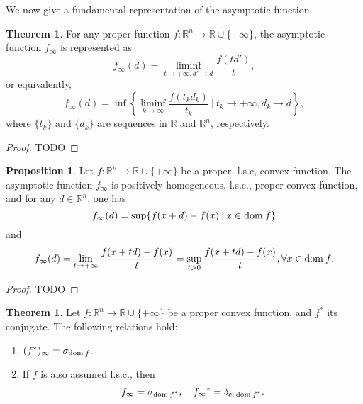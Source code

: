 \documentclass[a4paper,11pt, oneside]{book}
\theoremstyle{definition}
\newtheorem{prop}[dfn]{Proposition}
\newtheorem{thm}[dfn]{Theorem}
\newcommand{\RealNumberSet}{\mathbb{R}}
\newcommand{\NDemenstionalRealEuclideanSpace}{\mathbb{R}^n}
\newcommand{\Closure}[1]{\text{\rm cl\:${#1}$}} %
\newcommand{\Domain}[1]{\text{\rm dom\:${#1}$}} %
\newcommand{\ExtendedRealValuedFunction}[2]{{#1}: {#2} \to \RealNumberSet \cup \{+\infty\}}
\newcommand{\ConjugateFunction}[1]{{#1}^*}
\newcommand{\SupportFunction}[1]{\sigma_{#1}}
\newcommand{\IndicatorFunction}[1]{\delta_{#1}}
\begin{document}
We now give a fundamental representation of the asymptotic function.

\begin{thm}
  For any proper function $\ExtendedRealValuedFunction{f}{\NDemenstionalRealEuclideanSpace}$, the asymptotic function $f_{\infty}$ is represented as
  \begin{equation}
    f_{\infty}(d) = \liminf_{t \to +\infty, d' \to d} \frac{f(td')}{t},
  \end{equation}
  or equivalently,
  \begin{equation}
    f_{\infty}(d) = \inf \left\{ \liminf_{k \to \infty} \frac{f(t_k d_k)}{t_k} \:|\: t_k \to +\infty, d_k \to d \right\},
  \end{equation}
  where $\{t_k\}$ and $\{d_k\}$ are sequences in $\RealNumberSet$ and  $\NDemenstionalRealEuclideanSpace$, respectively.
\end{thm}

\begin{proof}
  TODO
\end{proof}

\begin{prop}
  Let $\ExtendedRealValuedFunction{f}{\NDemenstionalRealEuclideanSpace}$ be a proper, l.s.c, convex function. The asymptotic function $f_{\infty}$ is positively homogeneous, l.s.c., proper convex function, and for any $d \in \NDemenstionalRealEuclideanSpace$, one has
  \begin{equation}
    f_{\infty}(d) = \sup \{f(x+d) -f(x) \:|\: x \in \Domain{f}\}
  \end{equation}
  and
  \begin{equation}
    f_{\infty}(d) = \lim_{t \to +\infty} \frac{f(x+td) -f(x)}{t} = \sup_{t>0} \frac{f(x+td) - f(x)}{t}, \forall x \in \Domain{f}.
  \end{equation}
\end{prop}

\begin{proof}
  TODO
\end{proof}

\begin{thm}
  Let $\ExtendedRealValuedFunction{f}{\NDemenstionalRealEuclideanSpace}$ be a proper convex function, and $\ConjugateFunction{f}$ its conjugate. The following relations hold:
  \begin{enumerate}[label=\alph*,align=CenterWithParen]
    \item $(\ConjugateFunction{f})_{\infty} = \SupportFunction{\Domain{f}}$.
    \item If $f$ is also assumed l.s.c., then
    \begin{equation}
      f_{\infty} = \SupportFunction{\Domain{\ConjugateFunction{f}}},\quad \ConjugateFunction{f_{\infty}} = \IndicatorFunction{\Closure{\Domain{\ConjugateFunction{f}}}}. \notag
    \end{equation}
  \end{enumerate}
\end{thm}
\end{document}
